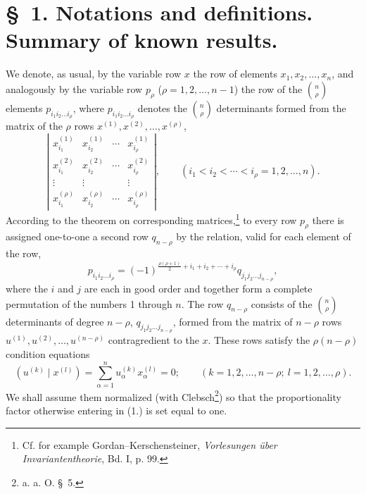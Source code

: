 \documentclass[11pt]{article}
\begin{document}
\section*{\S\ 1. Notations and definitions. Summary of known results.}
We denote, as usual, by the variable row $x$ the row of elements $x_1,x_2,\ldots,x_n$, and analogously by the variable row $p_\rho$ ($\rho=1,2,\ldots,n-1$) the row of the $\binom n\rho$ elements $p_{i_1i_2\ldots i_\rho}$, where $p_{i_1i_2\ldots i_\rho}$ denotes the $\binom n\rho$ determinants formed from the matrix of the $\rho$ rows $x^{(1)},x^{(2)},\ldots,x^{(\rho)}$,
\[
\left|\begin{array}{cccc}
 x_{i_1}^{(1)}&x_{i_2}^{(1)}&\cdots&x_{i_\rho}^{(1)}\\
 x_{i_1}^{(2)}&x_{i_2}^{(2)}&\cdots&x_{i_\rho}^{(2)}\\
 \vdots&\vdots&&\vdots\\
 x_{i_1}^{(\rho)}&x_{i_2}^{(\rho)}&\cdots&x_{i_\rho}^{(\rho)}
\end{array}\right|,
\qquad (i_1<i_2<\cdots<i_\rho=1,2,\ldots,n).
\]
According to the theorem on corresponding matrices,\footnote{Cf. for example Gordan--Kerschensteiner, \emph{Vorlesungen über Invariantentheorie}, Bd. I, p. 99.} to every row $p_\rho$ there is assigned one-to-one a second row $q_{n-\rho}$ by the relation, valid for each element of the row,
\begin{equation}
 p_{i_1i_2\ldots i_\rho}=(-1)^{\frac{\rho(\rho+1)}{2}+i_1+i_2+\cdots+i_\rho}q_{j_1j_2\ldots j_{n-\rho}},
\tag{1}
\end{equation}
where the $i$ and $j$ are each in good order and together form a complete permutation of the numbers 1 through $n$. The row $q_{n-\rho}$ consists of the $\binom n\rho$ determinants of degree $n-\rho$, $q_{j_1j_2\ldots j_{n-\rho}}$, formed from the matrix of $n-\rho$ rows $u^{(1)},u^{(2)},\ldots,u^{(n-\rho)}$ contragredient to the $x$. These rows satisfy the $\rho(n-\rho)$ condition equations
\begin{equation}
 (u^{(k)}\mid x^{(l)})=\sum_{\alpha=1}^{n}u_\alpha^{(k)}x_\alpha^{(l)}=0;
 \qquad (k=1,2,\ldots,n-\rho;\ l=1,2,\ldots,\rho).
\tag{2}
\end{equation}
We shall assume them normalized (with Clebsch\footnote{a. a. O. \S\ 5.}) so that the proportionality factor otherwise entering in (1.) is set equal to one.
\end{document}
